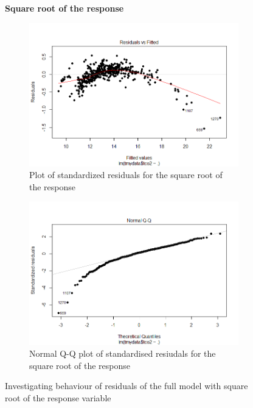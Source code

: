 \documentclass[12pt]{article}
\begin{document}
\begin{figure}[!h]
  \centering
  \textbf{Square root of the response}
  \begin{subfigure}[b]{0.5\linewidth}
      \centering
      \includegraphics[width=\textwidth]{project3/resVsFit_sqrt.png}
      \caption{Plot of standardized residuals for the square root of \\ the response}
      \label{fig:resVsFit_sqrt}
  \end{subfigure}%
  \begin{subfigure}[b]{0.5\linewidth}
      \centering
   \includegraphics[width=\textwidth]{project3/QQ_sqrt.png}
   \caption{Normal Q-Q plot of standardised resiudals for the square root of the response}\label{fig:QQ_sqrt}
  \end{subfigure}%
 \caption{Investigating behaviour of residuals of the full model with square root of the response variable}
\end{figure}
\end{document}
